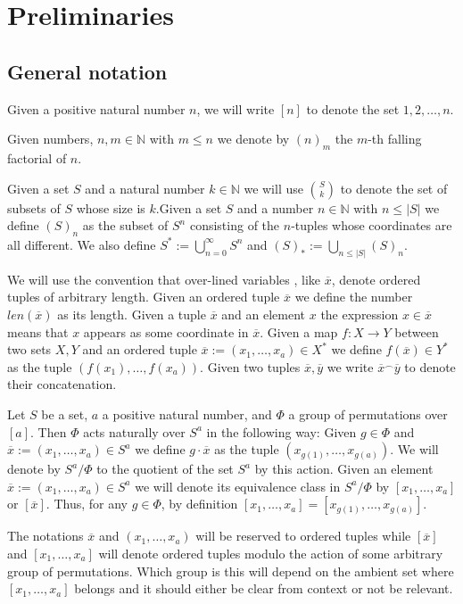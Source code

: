 \documentclass[12pt,notitlepage,a4paper]{article}
\theoremstyle{definition}
\newcommand{\N}{\mathbb{N}}
\begin{document}
\section{Preliminaries}

\subsection{General notation}\label{subsect:notation}

Given a positive natural number $n$, we will write
$[n]$ to denote the set ${1,2,\dots,n}$.\par
Given numbers, $n,m\in \N$ with $m\leq n$ we denote by
$(n)_m$ the $m$-th falling factorial of $n$. \par
Given a set $S$ and a natural number $k\in \N$
we will use $\binom{S}{k}$ to denote the set of 
subsets of $S$ whose size is $k$.Given a set
$S$ and a number $n\in \N$ with $n\leq |S|$ we define
$(S)_n$ as the subset of $S^n$ consisting of the $n$-tuples
whose coordinates are all different. 
We also define $S^*:=\bigcup_{n=0}^\infty S^n$ and
$(S)_*:=\bigcup_{n\leq |S|} (S)_n$. \par

We will use the convention that over-lined variables
, like $\overline{x}$, denote ordered tuples of arbitrary length.
Given an ordered tuple $\overline{x}$
we define the number $len(\overline{x})$ as its length. 
Given a tuple $\overline{x}$ and an element $x$ the expression
$x\in \overline{x}$ means that $x$ appears as some coordinate
in $\overline{x}$. 
Given a map $f:X\rightarrow Y$ between two sets $X, Y$ and 
an ordered tuple $\overline{x}:=(x_1,\dots,x_a)\in X^*$ 
we define $f(\overline{x})\in Y^*$ as the tuple 
$(f(x_1),\dots,f(x_a))$.
Given two tuples $\overline{x},\overline{y}$
we write $\overline{x}^\smallfrown \overline{y}$ to denote their 
concatenation.
\par



Let $S$ be a set, $a$ a positive natural number, 
and $\Phi$ a group of permutations over 
$[a]$. Then $\Phi$ acts naturally over
$S^a$ in the following way: Given $g\in \Phi$ and
$\overline{x}:=(x_1,\dots,x_a)\in S^a$ we define 
$g\cdot \overline{x}$ 
as the tuple $(x_{g(1)},\dots,x_{g(a)})$. 
We will denote by $S^a/\Phi$ to the quotient
of the set $S^a$ by this action. Given an element
$\overline{x}:=(x_1,\dots, x_a)\in S^a$ we will denote its equivalence
class in $S^a/\Phi$ by $[x_1,\dots,x_a]$ or $[\overline{x}]$.
Thus, for any
$g\in \Phi$, by definition $[x_1,\dots,x_a]=[x_{g(1)}
,\dots,x_{g(a)}]$. \par
The notations $\overline{x}$ and
$(x_1,\dots, x_a)$ 
will be reserved 
to ordered tuples while 
$[\overline{x}]$ and
$[x_1,\dots,x_a]$ will denote ordered tuples modulo the
action of some arbitrary group of permutations. Which group is
this will depend on the ambient set where $[x_1,\dots,x_a]$ belongs
and it should either be clear from context or not be relevant.\par
\end{document}
